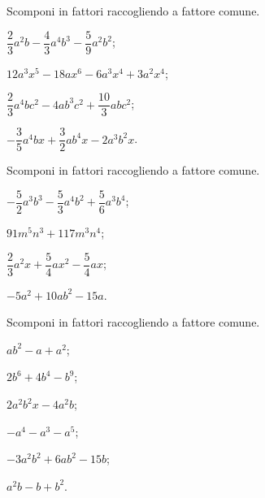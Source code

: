 \begin{esercizio}
\label{ese:15.7}
Scomponi in fattori raccogliendo a fattore comune.
\begin{multicols}{2}
\begin{enumeratea}
 \item $\dfrac{2}{3}a^{2}b-\dfrac{4}{3}a^{4}b^{3}-\dfrac{5}{9}a^{2}b^{2}$;
 \item $12a^{3}x^{5}-18ax^{6}-6a^{3}x^{4}+3a^{2}x^{4}$;
 \item $\dfrac{2}{3}a^{4}bc^{2}-4ab^{3}c^{2}+\dfrac{10}{3}abc^{2}$;
 \item $-{\dfrac{3}{5}}a^{4}bx+\dfrac{3}{2}ab^{4}x-2a^{3}b^{2}x$.
\end{enumeratea}
\end{multicols}
\end{esercizio}

\begin{esercizio}
\label{ese:15.8}
Scomponi in fattori raccogliendo a fattore comune.
\begin{multicols}{2}
\begin{enumeratea}
 \item $-{\dfrac{5}{2}}a^{3}b^{3}-\dfrac{5}{3}a^{4}b^{2}+\dfrac{5}{6}a^{3}b^{4}$;
 \item $91m^{5}n^{3}+117m^{3}n^{4}$;
 \item $\dfrac{2}{3}a^{2}x+\dfrac{5}{4}ax^{2}-\dfrac{5}{4}ax$;
 \item $-5a^{2}+10ab^{2}-15a$.
\end{enumeratea}
\end{multicols}
\end{esercizio}

\begin{esercizio}
\label{ese:15.9}
Scomponi in fattori raccogliendo a fattore comune.
\begin{multicols}{3}
\begin{enumeratea}
 \item $ab^{2}-a+a^{2}$;
 \item $2b^{6}+4b^{4}-b^{9}$;
 \item $2a^{2}b^{2}x-4a^{2}b$;
 \item $-a^{4}-a^{3}-a^{5}$;
 \item $-3a^{2}b^{2}+6ab^{2}-15b$;
 \item $a^{2}b-b+b^{2}$.
\end{enumeratea}
\end{multicols}
\end{esercizio}

